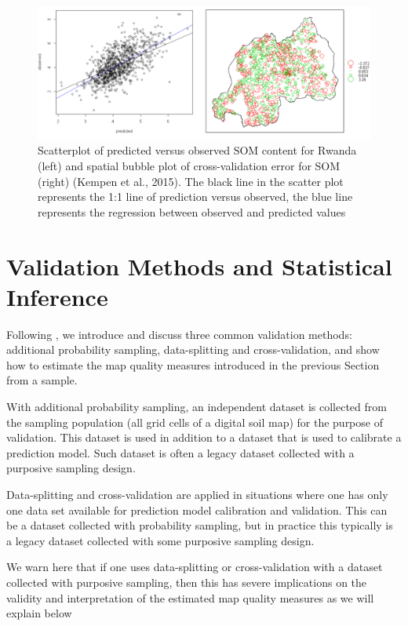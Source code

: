 \documentclass[10pt,b5paper,]{book}
\theoremstyle{definition}
\theoremstyle{definition}
\theoremstyle{definition}
\theoremstyle{remark}
\begin{document}
\begin{figure}
\includegraphics[width=0.8\linewidth]{images/Validation_Rwanda} \caption{Scatterplot of predicted versus observed SOM content for Rwanda (left) and spatial bubble plot of cross-validation error for SOM (right) (Kempen et al., 2015). The black line in the scatter plot represents the 1:1 line of prediction versus observed, the blue line represents the regression between observed and predicted values}\label{fig:rwandaval}
\end{figure}

\hypertarget{validationMeth}{%
\section{Validation Methods and Statistical
Inference}\label{validationMeth}}

Following \citet{brus2011sampling}, we introduce and discuss three
common validation methods: additional probability sampling,
data-splitting and cross-validation, and show how to estimate the map
quality measures introduced in the previous Section from a sample.

With additional probability sampling, an independent dataset is
collected from the sampling population (all grid cells of a digital soil
map) for the purpose of validation. This dataset is used in addition to
a dataset that is used to calibrate a prediction model. Such dataset is
often a legacy dataset collected with a purposive sampling design.

Data-splitting and cross-validation are applied in situations where one
has only one data set available for prediction model calibration and
validation. This can be a dataset collected with probability sampling,
but in practice this typically is a legacy dataset collected with some
purposive sampling design.

We warn here that if one uses data-splitting or cross-validation with a
dataset collected with purposive sampling, then this has severe
implications on the validity and interpretation of the estimated map
quality measures as we will explain below
\end{document}
